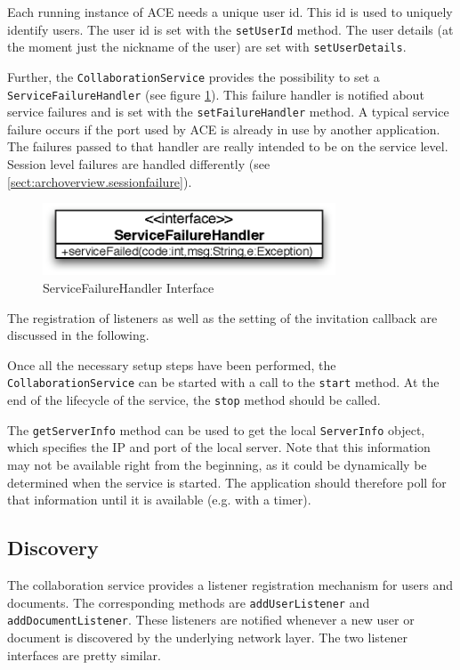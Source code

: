 Each running instance of ACE needs a unique user id. This id is used to uniquely
identify users. The user id is set with the \texttt{setUserId} method. The
user details (at the moment just the nickname of the user) are set with
\texttt{setUserDetails}.

Further, the \texttt{CollaborationService} provides the possibility to set a
\texttt{ServiceFailureHandler} 
(see figure \ref{fig:archoverview.servicefailurehandler}). 
This failure handler is notified about 
service failures and is set with the \texttt{setFailureHandler} method. 
A typical service failure occurs if the port used by
ACE is already in use by another application. The failures passed to that
handler are really intended to be on the service level. Session level failures
are handled differently (see \ref{sect:archoverview.sessionfailure}). 

\begin{figure}[H]
 \centering
 \includegraphics[width=8.71cm,height=2.15cm]{../images/finalreport/architecture_servicefailurehandler_uml.eps}
 \caption{ServiceFailureHandler Interface}
 \label{fig:archoverview.servicefailurehandler}
\end{figure}


The registration of listeners as well as the setting of the invitation 
callback are discussed in the following.

Once all the necessary setup steps have been performed, the
\texttt{CollaborationService} can be started with a call to the
\texttt{start} method. At the end of the lifecycle of the
service, the \texttt{stop} method should be called.

The \texttt{getServerInfo} method can be used to get the local 
\texttt{ServerInfo} object, which specifies the IP and port of the
local server. Note that this information may not be available right
from the beginning, as it could be dynamically be determined when the
service is started. The application should therefore poll for that information
until it is available (e.g. with a timer).


\subsection{Discovery}
The collaboration service provides a listener registration mechanism for
users and documents. The corresponding methods are \texttt{addUserListener}
and \texttt{addDocumentListener}. These listeners are notified whenever a
new user or document is discovered by the underlying network layer. The two 
listener interfaces are pretty similar. 

